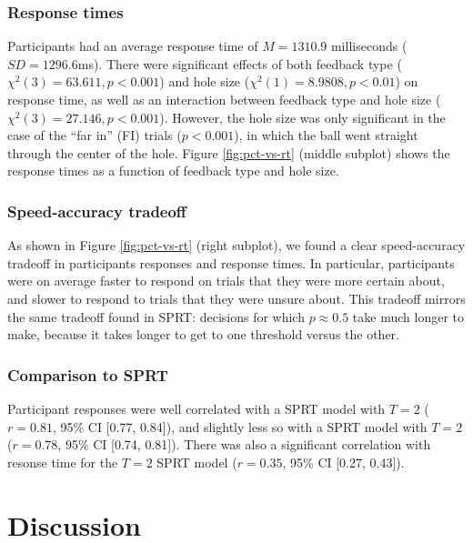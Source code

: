 \documentclass[11pt]{article}
\begin{document}
\subsubsection{Response times}

Participants had an average response time of $M=1310.9$ milliseconds ($SD=1296.6$ms). There were significant effects of both feedback type ($\chi^2(3)=63.611, p<0.001$) and hole size ($\chi^2(1)=8.9808, p<0.01$) on response time, as well as an interaction between feedback type and hole size ($\chi^2(3)=27.146, p<0.001$). However, the hole size was only significant in the case of the ``far in'' (FI) trials ($p<0.001$), in which the ball went straight through the center of the hole. Figure \ref{fig:pct-vs-rt} (middle subplot) shows the response times as a function of feedback type and hole size.

\subsubsection{Speed-accuracy tradeoff}

As shown in Figure \ref{fig:pct-vs-rt} (right subplot), we found a clear speed-accuracy tradeoff in participants responses and response times. In particular, participants were on average faster to respond on trials that they were more certain about, and slower to respond to trials that they were unsure about. This tradeoff mirrors the same tradeoff found in SPRT: decisions for which $p\approx0.5$ take much longer to make, because it takes longer to get to one threshold versus the other.

\subsubsection{Comparison to SPRT}

Participant responses were well correlated with a SPRT model with $T=2$ ($r=0.81$, 95\% CI [0.77, 0.84]), and slightly less so with a SPRT model with $T=2$ ($r=0.78$, 95\% CI [0.74, 0.81]). There was also a significant correlation with resonse time for the $T=2$ SPRT model ($r=0.35$, 95\% CI [0.27, 0.43]).

\section{Discussion}


\end{document}
